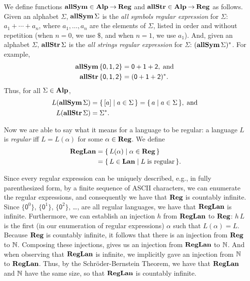 We define functions $\mathbf{allSym}\in\mathbf{Alp}\mathbin{\to}\mathbf{Reg}$ and $\mathbf{allStr}\in
\mathbf{Alp}\mathbin{\to}\mathbf{Reg}$ as follows.  Given an alphabet $\Sigma$, $\mathbf{allSym}\,\Sigma$
is the \emph{all symbols regular expression} for $\Sigma$:
$a_1+\cdots+a_n$, where $a_1,\ldots,a_n$
  are the elements of $\Sigma$, listed in order and without repetition
  (when $n=0$, we use $\$$, and when $n=1$, we use $a_1$).
And, given an alphabet $\Sigma$, $\mathbf{allStr}\,\Sigma$ is
the \emph{all strings regular expression} for $\Sigma$:
$(\mathbf{allSym}\,\Sigma)^*$.
For example, 
\begin{align*}
\mathbf{allSym}\,\{\mathsf{0,1,2}\} &= \mathsf{0 + 1 + 2} , \;\allowbreak\mbox{and}\allowbreak\; \\
\mathbf{allStr}\,\{\mathsf{0,1,2}\} &= (\mathsf{0 + 1 + 2})^* .
\end{align*}
Thus, for all $\Sigma\in\mathbf{Alp}$,
\begin{align*}
L(\mathbf{allSym}\,\Sigma) &= \{ \, [a] \mid a\in\Sigma \, \} = \{ \, a \mid a\in\Sigma \, \},
\;\allowbreak\mbox{and}\allowbreak\; \\
L(\mathbf{allStr}\,\Sigma) &= \Sigma^* .
\end{align*}

%
%
Now we are able to say what it means for a language to be regular:
a language $L$ is \emph{regular} iff $L=L(\alpha)$ for some
$\alpha\in\mathbf{Reg}$.  We define
%
%
\begin{align*}
\mathbf{RegLan} &= \{ \, L(\alpha) \mid \alpha\in\mathbf{Reg} \, \} \\
&= \{ \, L\in\mathbf{Lan} \mid L\;\allowbreak\mbox{is regular}\allowbreak \, \} .
\end{align*}

Since every regular expression can be uniquely described, e.g., in fully
parenthesized form, by a finite sequence of ASCII characters, we can
enumerate the regular expressions, and consequently we have that
$\mathbf{Reg}$ is countably infinite.  Since $\{\mathsf{0}^0\}$,
$\{\mathsf{0}^1\}$, $\{\mathsf{0}^2\}$, \ldots, are all regular
languages, we have that $\mathbf{RegLan}$ is infinite.  Furthermore, we can
establish an injection $h$ from $\mathbf{RegLan}$ to $\mathbf{Reg}$: $h\,L$ is the
first (in our enumeration of regular expressions) $\alpha$ such that
$L(\alpha)=L$.  Because $\mathbf{Reg}$ is countably infinite, it follows that
there is an injection from $\mathbf{Reg}$ to $\mathbb{N}$.  Composing these
injections, gives us an injection from $\mathbf{RegLan}$ to $\mathbb{N}$.  And when
observing that $\mathbf{RegLan}$ is infinite, we implicitly gave an injection
from $\mathbb{N}$ to $\mathbf{RegLan}$. Thus, by the Schr\"oder-Bernstein Theorem,
we have that $\mathbf{RegLan}$ and $\mathbb{N}$ have the same size, so that
$\mathbf{RegLan}$ is countably infinite.

